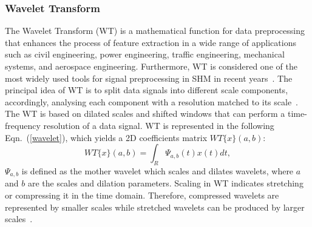\subsubsection{Wavelet Transform} 
The Wavelet Transform (WT) is a mathematical function for data preprocessing that enhan\-ces the process of feature extraction in a wide range of applications such as civil engineering, power engineering, traffic engineering, mechanical systems, and aerospace engineering.
Furthermore, WT is considered one of the most widely used tools for signal preproces\-sing in SHM in recent years~\cite{Taha2006}.
The principal idea of WT is to split data signals into different scale components, accordingly, analysing each component with a resolution matched to its scale~\cite{Graps1995}.
The WT is based on dilated scales and shifted windows that can perform a time-frequency resolution of a data signal. 
WT is represented in the following Eqn.~(\ref{wavelet}), which yields a 2D coefficients matrix  $WT\{x\}(a,b)$:
\begin{equation}
	WT\{x\}(a,b) = \int_{R}^{}\Psi_{a,b}(t)x(t)dt,
	\label{wavelet}
\end{equation}
$\Psi_{a,b}$ is defined as the mother wavelet which scales and dilates wavelets, where $a$ and $b$ are the scales and dilation parameters.
Scaling in WT indicates stretching or compressing it in the time domain. 
Therefore, compressed wavelets are represented by smaller scales while stretched wavelets can be produced by larger scales~\cite{Graps1995}.
%
